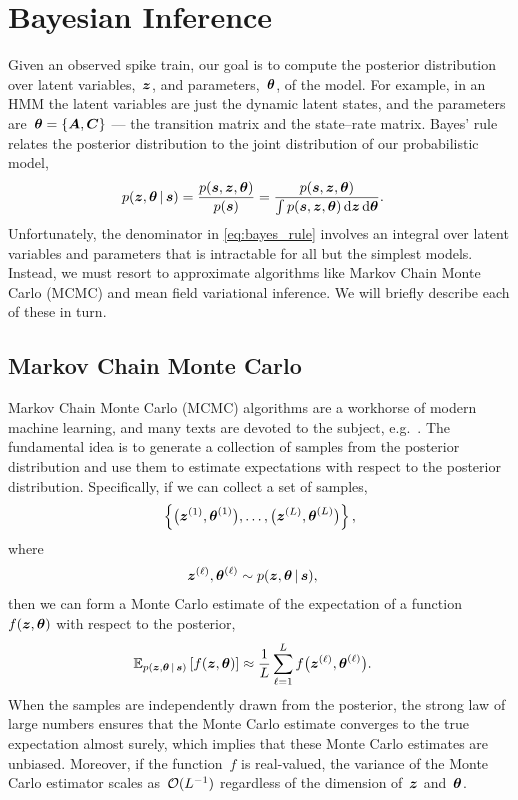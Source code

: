 \section{Bayesian Inference}
Given an observed spike train, our goal is to compute the posterior
distribution over latent variables,~$\boldsymbol{z}$, and parameters,~$\boldsymbol{\theta}$,
of the model.  For example, in an HMM the latent variables are just
the dynamic latent states, and the parameters
are~${\boldsymbol{\theta} = \{\boldsymbol{A}, \boldsymbol{C}\}}$ --- the transition matrix and the
state--rate matrix. Bayes' rule relates the posterior distribution to
the joint distribution of our probabilistic model,
\begin{align}
  \label{eq:bayes_rule}
  p(\boldsymbol{z}, \boldsymbol{\theta} \,|\, \boldsymbol{s}) 
  &= \frac{p(\boldsymbol{s}, \boldsymbol{z}, \boldsymbol{\theta})}{p(\boldsymbol{s})} 
   = \frac{p(\boldsymbol{s}, \boldsymbol{z}, \boldsymbol{\theta})}{\int p(\boldsymbol{s}, \boldsymbol{z}, \boldsymbol{\theta}) \, \mathrm{d}\boldsymbol{z} \, \mathrm{d}\boldsymbol{\theta}} .
\end{align}
Unfortunately, the denominator in \eqref{eq:bayes_rule} involves an 
integral over latent variables and parameters that is intractable for 
all but the simplest models. Instead, we must resort to approximate 
algorithms like Markov Chain Monte Carlo (MCMC) and mean field variational 
inference. We will briefly describe each of these in turn.

\subsection{Markov Chain Monte Carlo}
Markov Chain Monte Carlo (MCMC) algorithms are a workhorse of modern
machine learning, and many texts are devoted to the subject,
e.g.~\cite{geyer1992practical, gilks2005markov, robert2013monte}.  The
fundamental idea is to generate a collection of samples from the
posterior distribution and use them to estimate expectations with
respect to the posterior distribution.  Specifically, if we can collect a set of
samples,
\begin{align}
  \left \{ \big(\boldsymbol{z}^{(1)}, \boldsymbol{\theta}^{(1)} \big), 
           \ldots, 
           \big(\boldsymbol{z}^{(L)}, \boldsymbol{\theta}^{(L)} \big) 
  \right\},
\end{align}
where
\begin{align}
  \boldsymbol{z}^{(\ell)}, \boldsymbol{\theta}^{(\ell)} &\sim p(\boldsymbol{z}, \boldsymbol{\theta} \,|\, \boldsymbol{s}),
\end{align}
then we can form a Monte Carlo estimate of the expectation of a function~$f(\boldsymbol{z}, \boldsymbol{\theta})$
with respect to the posterior,
\begin{align}
  \mathbb{E}_{p(\boldsymbol{z}, \boldsymbol{\theta} \,|\, \boldsymbol{s})} \left[ f(\boldsymbol{z}, \boldsymbol{\theta}) \right] 
  &\approx \frac{1}{L} \sum_{\ell = 1}^L f \big(\boldsymbol{z}^{(\ell)}, \boldsymbol{\theta}^{(\ell)} \big).
\end{align}
When the samples are independently drawn from the posterior, the strong 
law of large numbers ensures that the Monte Carlo estimate converges to 
the true expectation almost surely, which implies that these Monte Carlo
estimates are unbiased. Moreover, if the function~$f$ is real-valued, 
the variance of the Monte Carlo estimator scales as~$\mathcal{O}(L^{-1})$
regardless of the dimension of~$\boldsymbol{z}$ and~$\boldsymbol{\theta}$.


